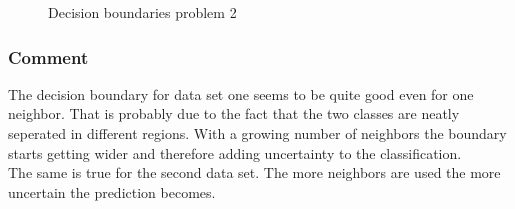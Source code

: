 \documentclass{article}
\begin{document}
\begin{figure}[htbp]
		
		
		\caption{\label{boundary2.3p2}Decision boundaries problem 2}
		
	\end{figure}

\subsubsection{Comment}
The decision boundary for data set one seems to be quite good even for one neighbor. That is probably due to the fact that the two classes are neatly seperated in different regions. With a growing number of neighbors the boundary starts getting wider and therefore adding uncertainty to the classification. \\
The same is true for the second data set. The more neighbors are used the more uncertain the prediction becomes.
\end{document}
